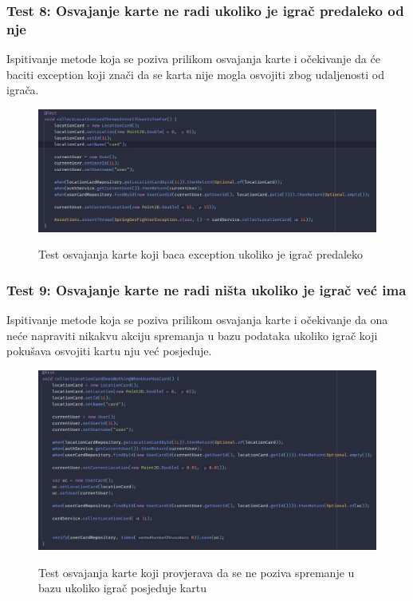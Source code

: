 			\subsubsection{Test 8: Osvajanje karte ne radi ukoliko je igrač predaleko od nje}
			Ispitivanje metode koja se poziva prilikom osvajanja karte i očekivanje da će baciti exception koji znači da se karta nije mogla osvojiti zbog udaljenosti od igrača.
			
			\begin{figure}[H]
				\centering
				\includegraphics[scale=0.55]{slike/test8} \\
				\caption{ Test osvajanja karte koji baca exception ukoliko je igrač predaleko }
				\label{fig:test8}
			\end{figure}
		
			\subsubsection{Test 9: Osvajanje karte ne radi ništa ukoliko je igrač već ima}
			Ispitivanje metode koja se poziva prilikom osvajanja karte i očekivanje da ona neće napraviti nikakvu akciju spremanja u bazu podataka ukoliko igrač koji pokušava osvojiti kartu nju već posjeduje.
			
			\begin{figure}[H]
				\centering
				\includegraphics[scale=0.55]{slike/test9} \\
				\caption{ Test osvajanja karte koji provjerava da se ne poziva spremanje u bazu ukoliko igrač posjeduje kartu}
				\label{fig:test9}
			\end{figure}
		
